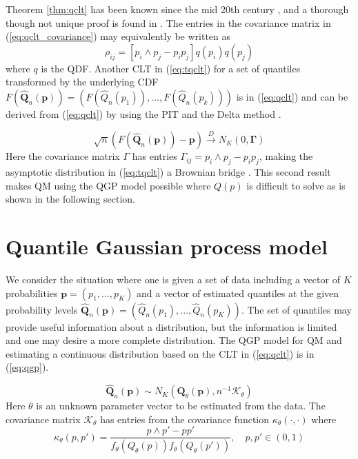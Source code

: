 \documentclass[preprint,12pt,authoryear]{elsarticle}
\newcommand{\1}[1]{\mathds{1}\left[#1\right]}
\begin{document}
Theorem \ref{thm:qclt} has been known since the mid 20th century 
\cite[]{cramer1951mathematical}, and a thorough though not unique proof is 
found in \cite{walker1968note}. The entries in the covariance matrix in 
(\ref{eq:qclt_covariance}) may equivalently be written as
\begin{equation}
    \rho_{ij} = [p_i \wedge p_j - p_i p_j]q(p_i)q(p_j)
    \label{eq:qgp_simp_cov}
\end{equation}
where $q$ is the QDF. Another CLT in (\ref{eq:tqclt}) for a set of quantiles 
transformed by the underlying CDF $F(\hat{\boldsymbol{Q}}_n(\boldsymbol{p})) = 
(F(\hat{Q}_n(p_1)), ..., F(\hat{Q}_n(p_k)))$ is in (\ref{eq:qclt}) and can be 
derived from (\ref{eq:qclt}) by using the PIT and the Delta method 
\cite[]{parzen2004quantile}.

\begin{equation}
    \label{eq:tqclt}
    \sqrt{n}(F(\hat{\boldsymbol{Q}}_n(\boldsymbol{p})) - \boldsymbol{p}) 
    \overset{D}{\rightarrow} N_K(0, \boldsymbol{\Gamma})
\end{equation}
Here the covariance matrix $\Gamma$ has entries $\Gamma_{ij} = p_i \wedge p_j - 
p_i p_j$, making the asymptotic distribution in (\ref{eq:tqclt}) a 
Brownian bridge \cite[]{chow2009brownian}. This second result makes QM using 
the QGP model possible where $Q(p)$ is difficult to solve as is shown in the 
following section.




\section{Quantile Gaussian process model} \label{sec:qgp_model}

We consider the situation where one is given a set of data including a vector 
of $K$ probabilities $\boldsymbol{p} = (p_1, ..., p_K)$ and a vector of 
estimated quantiles at the given probability levels 
$\hat{\boldsymbol{Q}}_n(\boldsymbol{p}) = (\hat{Q}_n(p_1), ..., \hat{Q}_n(p_K))$. 
The set of quantiles may provide useful information about a distribution, but 
the information is limited and one may desire a more complete distribution.
The QGP model for QM and estimating a continuous distribution based on the CLT 
in (\ref{eq:qclt}) is in (\ref{eq:qgp}).



\begin{equation}
    \label{eq:qgp}
\hat{\boldsymbol{Q}}_n(\boldsymbol{p}) \sim N_K(\boldsymbol{Q}_{\theta}(\boldsymbol{p}), n^{-1} \boldsymbol{\mathcal{K}}_{\theta})
\end{equation}
Here $\theta$ is an unknown parameter vector to be estimated from the data. The 
covariance matrix $\boldsymbol{\mathcal{K}}_{\theta}$ has entries from the 
covariance function $\kappa_{\theta}(\cdot, \cdot)$ where 
\[
\kappa_{\theta}(p, p') = \frac{p\wedge p' - p p'}{f_{\theta}(Q_{\theta}(p)) f_{\theta}(Q_{\theta}(p'))}, \quad p, p' \in (0,1)
\]
\end{document}
